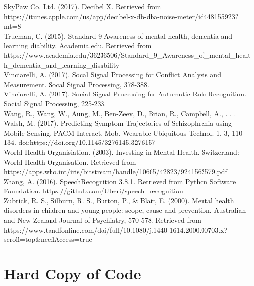 \documentclass[a4paper,11pt]{report}
\begin{document}
SkyPaw Co. Ltd. (2017). Decibel X. Retrieved from https://itunes.apple.com/us/app/decibel-x-db-dba-noise-meter/id448155923?mt=8\\

Trueman, C. (2015). Standard 9 Awareness of mental health, dementia and learning diability. Academia.edu. Retrieved from https://www.academia.edu/36236506/Standard\_9\_Awareness\_of\_mental\_health\_dementia\_and\_learning\_disability\\

Vinciarelli, A. (2017). Socal Signal Processing for Conflict Analysis and Measurement. Socal Signal Processing, 378-388.\\

Vinciarelli, A. (2017). Social Signal Processing for Automatic Role Recognition. Social Signal Processing, 225-233.\\

Wang, R., Wang, W., Aung, M., Ben-Zeev, D., Brian, R., Campbell, A., . . . Walsh, M. (2017). Predicting Symptom Trajectories of Schizophrenia using Mobile Sensing. PACM Interact. Mob. Wearable Ubiquitous Technol. 1, 3, 110-134. doi:https://doi.org/10.1145/3276145.3276157\\

World Health Organisiation. (2003). Investing in Mental Health. Switzerland: World Health Organisation. Retrieved from https://apps.who.int/iris/bitstream/handle/10665/42823/9241562579.pdf\\

Zhang, A. (2016). SpeechRecognition 3.8.1. Retrieved from Python Software Foundation: https://github.com/Uberi/speech\_recognition\\
Zubrick, R. S., Silburn, R. S., Burton, P., \& Blair, E. (2000). Mental health disorders in children and young people: scope, cause and prevention. Australian and New Zealand Journal of Psychiatry, 570-578. Retrieved from https://www.tandfonline.com/doi/full/10.1080/j.1440-1614.2000.00703.x?scroll=top\&needAccess=true\\


\chapter{Hard Copy of Code}
\end{document}
